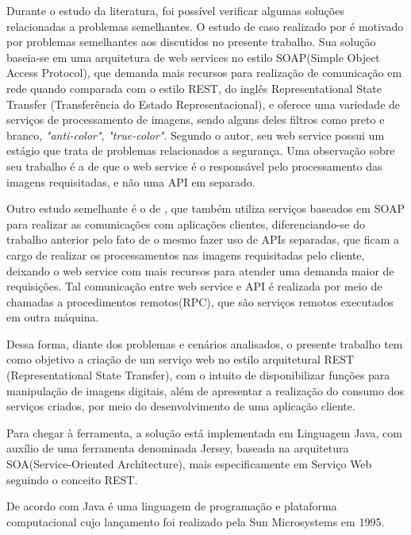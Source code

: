 \documentclass[12pt]{article}
\begin{document}
Durante o estudo da literatura, foi possível verificar algumas soluções relacionadas a problemas semelhantes. O estudo de caso realizado por \cite{vivek} é motivado por problemas semelhantes aos discutidos no presente
trabalho. Sua solução baseia-se em uma arquitetura de web services no estilo SOAP(Simple Object Access Protocol), que demanda mais recursos para realização de comunicação em rede quando comparada com o estilo REST, do inglês
Representational State Transfer (Transferência do Estado Representacional), e oferece uma variedade de serviços de processamento de imagens, sendo alguns deles filtros como preto e branco, \textit{"anti-color"}, \textit{"true-color"}. Segundo o autor, seu web service possui um estágio que trata de problemas relacionados a segurança. Uma observação sobre seu trabalho é a de que o web service é o responsável pelo processamento das imagens requisitadas, e não uma API em separado.


Outro estudo semelhante é o de \cite{martin}, que também utiliza serviços baseados em SOAP para realizar as comunicações com aplicações clientes, diferenciando-se do trabalho anterior pelo fato de o mesmo fazer uso de APIs separadas, que ficam a cargo de realizar os processamentos nas imagens requisitadas pelo cliente, deixando o web service com mais recursos para atender uma demanda maior de requisições. Tal comunicação entre web service e API é realizada por meio de chamadas a procedimentos remotos(RPC), que são serviços remotos executados em outra máquina. 

Dessa forma, diante dos problemas e cenários analisados, o presente trabalho tem como objetivo a criação de um serviço web no estilo arquitetural REST (Representational State Transfer), com o intuito de disponibilizar funções para manipulação de imagens digitais, além de apresentar a realização do consumo dos serviços criados, por meio do desenvolvimento de uma aplicação cliente.


Para chegar à ferramenta, a solução está implementada em Linguagem
Java, com auxílio de uma ferramenta denominada Jersey, baseada na arquitetura
SOA(Service-Oriented Architecture), mais especificamente em Serviço Web seguindo o conceito REST. 

De acordo com \cite{oracle} Java é uma linguagem de programação e plataforma computacional cujo lançamento foi realizado pela Sun Microsystems em 1995.
\end{document}
